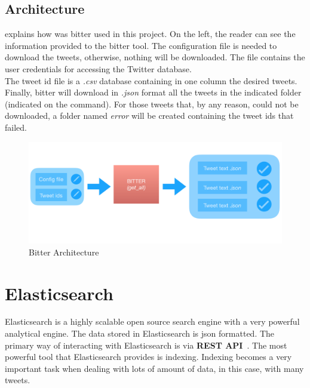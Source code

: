 \subsection{Architecture}
 explains how was bitter used in this project. On the left, the reader can see the information provided to the bitter tool. The configuration file is needed to download the tweets, otherwise, nothing will be downloaded. The file contains the user credentials for accessing the Twitter database.\\ The tweet id file is a \textit{.csv} database containing in one column the desired tweets. Finally, bitter will download in \textit{.json} format all the tweets in the indicated folder (indicated on the command). For those tweets that, by any reason, could not be downloaded, a folder named \textit{error} will be created containing the tweet ids that failed.
\begin{figure}
	\includegraphics[width=\linewidth]{img/bitter.png}
	\caption{Bitter Architecture}
	\label{fig:bitter}
\end{figure}
\section{Elasticsearch}
Elasticsearch is a highly scalable open source search engine with a very powerful analytical engine. The data stored in Elasticsearch is \ac{json} formatted. The primary way of interacting with Elasticsearch is via \textbf{REST API}~\cite{elastic1}. The most powerful tool that Elasticsearch provides is indexing. Indexing becomes a very important task when dealing with lots of amount of data, in this case, with many tweets.

